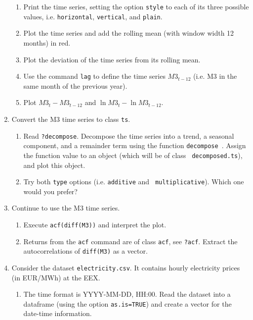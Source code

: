 \documentclass{article}
\begin{document}
\begin{enumerate}
\begin{enumerate}
\item Print the time series, setting the option \texttt{style} to each of
its three possible values, i.e. \texttt{horizontal}, \texttt{vertical}, and 
\texttt{plain}.

\item Plot the time series and add the rolling mean (with window width 12
months) in red.

\item Plot the deviation of the time series from its rolling mean.

\item Use the command \texttt{lag} to define the time series $M3_{t-12}$
(i.e. M3 in the same month of the previous year).

\item Plot $M3_{t}-M3_{t-12}$ and $\ln M3_{t}-\ln M3_{t-12}$.
\end{enumerate}

\item Convert the M3 time series to class \texttt{ts}.

\begin{enumerate}
\item Read \texttt{?decompose}. Decompose the time series into a trend, a
seasonal component, and a remainder term using the function \texttt{decompose%
}. Assign the function value to an object (which will be of class \texttt{%
decomposed.ts}), and plot this object.

\item Try both \texttt{type} options (i.e. \texttt{additive} and \texttt{%
multiplicative}). Which one would you prefer?
\end{enumerate}

\item Continue to use the M3 time series.

\begin{enumerate}
\item Execute \texttt{acf(diff(M3))} and interpret the plot.

\item Returns from the \texttt{acf} command are of class \texttt{acf}, see 
\texttt{?acf}. Extract the autocorrelations of \texttt{diff(M3)} as a vector.
\end{enumerate}

\item Consider the dataset \texttt{electricity.csv}. It contains hourly
electricity prices (in EUR/MWh) at the EEX.

\begin{enumerate}
\item The time format is YYYY-MM-DD, HH:00. Read the dataset into a
dataframe (using the option \texttt{as.is=TRUE}) and create a vector for the
date-time information.


\end{enumerate}
\end{enumerate}
\end{document}
